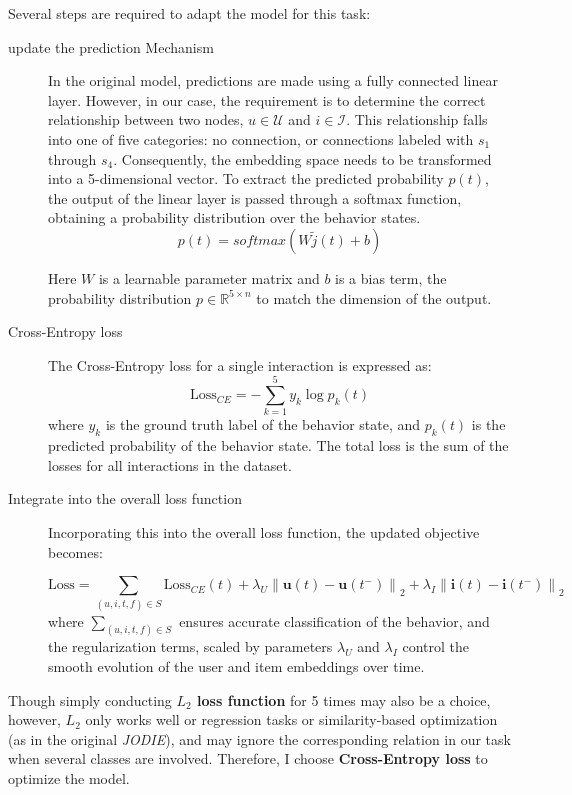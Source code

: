 Several steps are required to adapt the model for this task:
\begin{description}
    \item[update the prediction Mechanism]
    In the original model, predictions are made using a fully connected linear layer. However, in our case, the requirement is to determine the correct relationship between two nodes, $u \in \mathcal{U} $ and $i \in \mathcal{I} $. This relationship falls into one of five categories: no connection, or connections labeled with $s_1$ through $s_4$. Consequently, the embedding space needs to be transformed into a 5-dimensional vector. To extract the predicted probability $p(t)$, the output of the linear layer is passed through a softmax function, obtaining a probability distribution over the behavior states.
    \[ p(t)=softmax(W \tilde{j}(t) + b)\]

    Here $W$ is a learnable parameter matrix and $b$ is a bias term, the probability distribution $p \in \mathbb{R} ^{5 \times n}$ to match the dimension of the output.
    \item[Cross-Entropy loss] 
    
    The Cross-Entropy loss for a single interaction is expressed as:
    \[ \text{Loss}_{CE} = -\sum_{k=1}^{5} y_k \log p_k(t) \]
    where $y_k$ is the ground truth label of the behavior state, and $p_k(t)$ is the predicted probability of the behavior state. The total loss is the sum of the losses for all interactions in the dataset.
    
    
    \item[Integrate into the overall loss function] 
    
    Incorporating this into the overall loss function, the updated objective becomes:

    \begin{equation}
        \text{Loss} = \sum_{(u, i, t, f) \in S} \text{Loss}_{CE}(t)
        + \lambda_U \left\| \mathbf{u}(t) - \mathbf{u}(t^-) \right\|_2 
        + \lambda_I \left\| \mathbf{i}(t) - \mathbf{i}(t^-) \right\|_2
        \end{equation}
    where $\sum_{(u, i, t, f) \in S}$ ensures accurate classification of the behavior, and the regularization terms, scaled by parameters $\lambda_U$ and $\lambda_I$ control the smooth evolution of the user and item embeddings over time.
\end{description}

Though simply conducting \textbf{$L_2$ loss function} for 5 times may also be a choice, however, $L_2$ only works well or regression tasks or similarity-based optimization (as in the original \textit{JODIE}), and may ignore the corresponding relation in our task when several classes are involved. Therefore, I choose \textbf{Cross-Entropy loss} to optimize the model.

